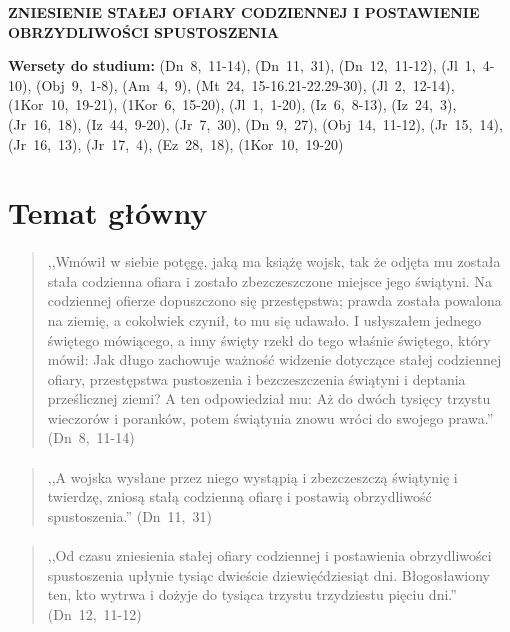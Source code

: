 \documentclass[10pt,a4paper,oneside]{article}
\begin{document}
\centerline{\textbf{\MakeUppercase{Zniesienie stałej ofiary codziennej i postawienie obrzydliwości spustoszenia}}}
\begin{center}
\textbf{Wersety do studium:} \mbox{(Dn 8, 11-14)}, \mbox{(Dn 11, 31)}, \mbox{(Dn 12, 11-12)}, \mbox{(Jl 1, 4-10)}, \mbox{(Obj 9, 1-8)}, \mbox{(Am 4, 9)}, \mbox{(Mt 24, 15-16.21-22.29-30)}, \mbox{(Jl 2, 12-14)}, \mbox{(1Kor 10, 19-21)}, \mbox{(1Kor 6, 15-20)}, \mbox{(Jl 1, 1-20)}, \mbox{(Iz 6, 8-13)}, \mbox{(Iz 24, 3)}, \mbox{(Jr 16, 18)}, \mbox{(Iz 44, 9-20)}, \mbox{(Jr 7, 30)}, \mbox{(Dn 9, 27)}, \mbox{(Obj 14, 11-12)}, \mbox{(Jr 15, 14)}, \mbox{(Jr 16, 13)}, \mbox{(Jr 17, 4)}, \mbox{(Ez 28, 18)}, \mbox{(1Kor 10, 19-20)}
\end{center}
\section{Temat główny}
\paragraph{}
\begin{quote}
,,Wmówił w siebie potęgę, jaką ma książę wojsk, tak że odjęta mu została stała codzienna ofiara i zostało zbezczeszczone miejsce jego świątyni. Na codziennej ofierze dopuszczono się przestępstwa; prawda została powalona na ziemię, a cokolwiek czynił, to mu się udawało. I usłyszałem jednego świętego mówiącego, a inny święty rzekł do tego właśnie świętego, który mówił: Jak długo zachowuje ważność widzenie dotyczące stałej codziennej ofiary, przestępstwa pustoszenia i bezczeszczenia świątyni i deptania prześlicznej ziemi? A ten odpowiedział mu: Aż do dwóch tysięcy trzystu wieczorów i poranków, potem świątynia znowu wróci do swojego prawa.'' \mbox{(Dn 8, 11-14)}
\end{quote}
\paragraph{}
\begin{quote}
,,A wojska wysłane przez niego wystąpią i zbezczeszczą świątynię i twierdzę, zniosą stałą codzienną ofiarę i postawią obrzydliwość spustoszenia.'' \mbox{(Dn 11, 31)}
\end{quote}
\paragraph{}
\begin{quote}
,,Od czasu zniesienia stałej ofiary codziennej i postawienia obrzydliwości spustoszenia upłynie tysiąc dwieście dziewięćdziesiąt dni. Błogosławiony ten, kto wytrwa i dożyje do tysiąca trzystu trzydziestu pięciu dni.'' \mbox{(Dn 12, 11-12)}
\end{quote}
\end{document}
